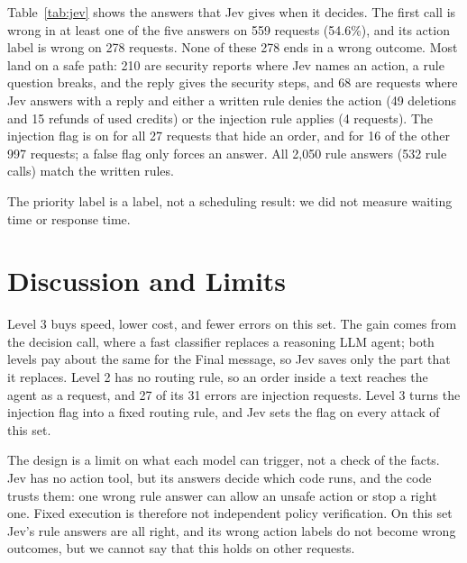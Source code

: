 \documentclass[sigconf,nonacm]{acmart}
\begin{document}
Table~\ref{tab:jev} shows the answers that Jev gives when it decides. The first call is wrong in at least one of the five answers on 559 requests (54.6\%), and its action label is wrong on 278 requests. None of these 278 ends in a wrong outcome. Most land on a safe path: 210 are security reports where Jev names an action, a rule question breaks, and the reply gives the security steps, and 68 are requests where Jev answers with a reply and either a written rule denies the action (49 deletions and 15 refunds of used credits) or the injection rule applies (4 requests). The injection flag is on for all 27 requests that hide an order, and for 16 of the other 997 requests; a false flag only forces an answer. All 2,050 rule answers (532 rule calls) match the written rules.

The priority label is a label, not a scheduling result: we did not measure waiting time or response time.

\section{Discussion and Limits}\label{sec:discussion}

Level 3 buys speed, lower cost, and fewer errors on this set. The gain comes from the decision call, where a fast classifier replaces a reasoning LLM agent; both levels pay about the same for the Final message, so Jev saves only the part that it replaces. Level 2 has no routing rule, so an order inside a text reaches the agent as a request, and 27 of its 31 errors are injection requests. Level 3 turns the injection flag into a fixed routing rule, and Jev sets the flag on every attack of this set.

The design is a limit on what each model can trigger, not a check of the facts. Jev has no action tool, but its answers decide which code runs, and the code trusts them: one wrong rule answer can allow an unsafe action or stop a right one. Fixed execution is therefore not independent policy verification. On this set Jev's rule answers are all right, and its wrong action labels do not become wrong outcomes, but we cannot say that this holds on other requests.
\end{document}
